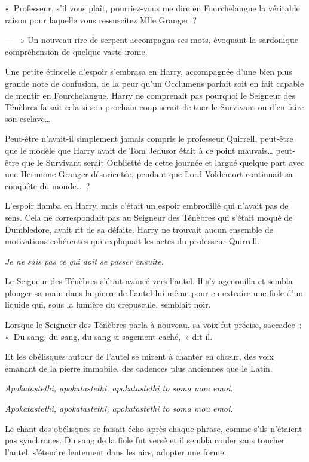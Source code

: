 «~Professeur, s'il vous plaît, pourriez-vous me dire en Fourchelangue la véritable raison pour laquelle vous ressuscitez Mlle Granger~?

--- ~» Un nouveau rire de serpent accompagna ses mots, évoquant la sardonique compréhension de quelque vaste ironie.

Une petite étincelle d'espoir s'embrasa en Harry, accompagnée d'une bien plus grande note de confusion, de la peur qu'un Occlumens parfait soit en fait capable de mentir en Fourchelangue. Harry ne comprenait pas pourquoi le Seigneur des Ténèbres faisait cela si son prochain coup serait de tuer le Survivant ou d'en faire son esclave…

Peut-être n'avait-il simplement jamais compris le professeur Quirrell, peut-être que le modèle que Harry avait de Tom Jedusor était à ce point mauvais… peut-être que le Survivant serait Oublietté de cette journée et largué quelque part avec une Hermione Granger désorientée, pendant que Lord Voldemort continuait sa conquête du monde…~?

L'espoir flamba en Harry, mais c'était un espoir embrouillé qui n'avait pas de sens. Cela ne correspondait pas au Seigneur des Ténèbres qui s'était moqué de Dumbledore, avait rit de sa défaite. Harry ne trouvait aucun ensemble de motivations cohérentes qui expliquait les actes du professeur Quirrell.

\emph{Je ne sais pas ce qui doit se passer ensuite.}

Le Seigneur des Ténèbres s'était avancé vers l'autel. Il s'y agenouilla et sembla plonger sa main dans la pierre de l'autel lui-même pour en extraire une fiole d'un liquide qui, sous la lumière du crépuscule, semblait noir.

Lorsque le Seigneur des Ténèbres parla à nouveau, sa voix fut précise, saccadée~: «~Du sang, du sang, du sang si sagement caché,~» dit-il.

Et les obélisques autour de l'autel se mirent à chanter en chœur, des voix émanant de la pierre immobile, des cadences plus anciennes que le Latin.

\emph{Apokatastethi, apokatastethi, apokatastethi to soma mou emoi.}

\emph{Apokatastethi, apokatastethi, apokatastethi to soma mou emoi.}

Le chant des obélisques se faisait écho après chaque phrase, comme s'ils n'étaient pas synchrones. Du sang de la fiole fut versé et il sembla couler sans toucher l'autel, s'étendre lentement dans les airs, adopter une forme.

